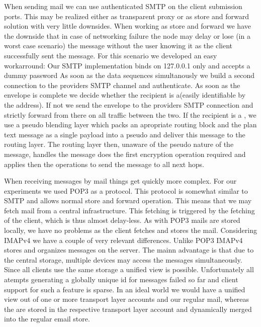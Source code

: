 When sending mail we can use authenticated SMTP on the client submission ports. This may be realized either as transparent proxy or as store and forward solution with very little downsides. When working as store and forward we have the downside that in case of networking failure the node may delay or lose (in a worst case scenario) the message without the user knowing it as the client successfully sent the message. For this scenario we developed an easy workarround: Our SMTP implementation binds on 127.0.0.1 only and accepts a dummy password As soon as the data sequences simultanously we build a second connection to the providers SMTP channel and authenticate. As soon as the envelope is complete we decide whether the recipient is a\VortexNode (easily identifiable by the address).  If not we send the envelope to the providers SMTP connection and strictly forward from there on all traffic between the two. If the recipient is a \VortexNode{}, we use a pseudo blending layer which packs an apropriate routing block and the plan text message as a single payload into a pseudo \VortexMessage and deliver this message to the routing layer. The routing layer then, unaware of the pseudo nature of the message, handles the message does the first encryption operation required and applies then the operations to send the message to all next hops.

When receiving messages by mail things get quickly more complex. For our experiments we used POP3 as a protocol. This protocol is somewhat similar to SMTP and allows normal store and forward operation. This means that we may fetch mail from a central infrastructure. This fetching is triggered by the fetching of the client, which is thus almost delay-less. As with POP3 mails are stored locally, we have no problems as the client fetches and stores the mail. Considering IMAPv4 we have a couple of very relevant differences. Unlike POP3 IMAPv4 stores and organizes messages on the server. The mainn advantage is that due to the central storage, multiple devices may access the messages simultaneously. Since all clients use the same storage a unified view is possible. Unfortunately all atempts generating a globally unique id for messages failed so far and client support for such a feature is sparse. In an ideal world we would have a unified view out of one or more \MessageVortex{} transport layer accounts and our regular mail, whereas the \VortexMessages{} are stored in the respective transport layer account and dynamically merged into the regular email store. 

